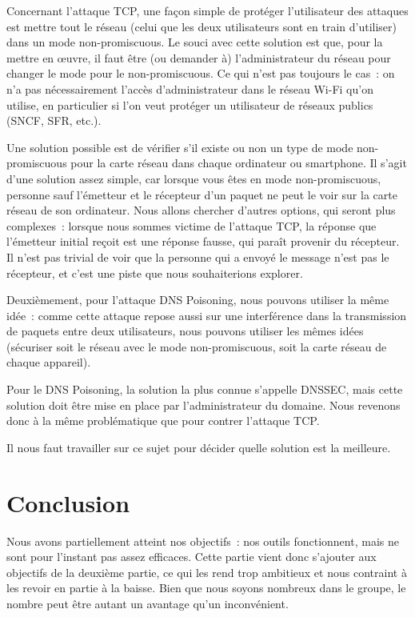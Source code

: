 \documentclass[a4paper, 12pt,twoside]{article}
\begin{document}
            Concernant l'attaque TCP, une façon simple de protéger l'utilisateur des attaques est mettre tout le réseau (celui que les deux utilisateurs sont en train d'utiliser) dans un mode non-promiscuous. Le souci avec cette solution est que, pour la mettre en \oe{}uvre, il faut être (ou demander à) l'administrateur du réseau pour changer le mode pour le non-promiscuous. Ce qui n'est pas toujours le cas~: on n'a pas nécessairement l'accès d'administrateur dans le réseau Wi-Fi qu'on utilise, en particulier si l'on veut protéger un utilisateur de réseaux publics (SNCF, SFR, etc.).

            Une solution possible est de vérifier s'il existe ou non un type de mode non-promiscuous pour la carte réseau dans chaque ordinateur ou smartphone. Il s'agit d'une solution assez simple, car lorsque vous êtes en mode non-promiscuous, personne sauf l'émetteur et le récepteur d'un paquet ne peut le voir sur la carte réseau de son ordinateur. Nous allons chercher d'autres options, qui seront plus complexes~:  lorsque nous sommes victime de l'attaque TCP, la réponse que l'émetteur initial reçoit est une réponse fausse, qui paraît provenir du récepteur. Il n'est pas trivial de voir que la personne qui a envoyé le message n'est pas le récepteur, et c'est une piste que nous souhaiterions explorer.

            Deuxièmement, pour l'attaque DNS Poisoning, nous pouvons utiliser la même idée~: comme cette attaque repose aussi sur une interférence dans la transmission de paquets entre deux utilisateurs, nous pouvons utiliser les mêmes idées (sécuriser soit le réseau avec le mode non-promiscuous, soit la carte réseau de chaque appareil).

            Pour le DNS Poisoning, la solution la plus connue s'appelle DNSSEC, mais cette solution doit être mise en place par l'administrateur du domaine. Nous revenons donc à la même problématique que pour contrer l'attaque TCP.

            Il nous faut travailler sur ce sujet pour décider quelle solution est la meilleure.

    \clearpage
    \section*{Conclusion}

        Nous avons partiellement atteint nos objectifs~: nos outils fonctionnent, mais ne sont pour l'instant pas assez efficaces. Cette partie vient donc s'ajouter aux objectifs de la deuxième partie, ce qui les rend trop ambitieux et nous contraint à les revoir en partie à la baisse. Bien que nous soyons nombreux dans le groupe, le nombre peut être autant un avantage qu'un inconvénient.
\end{document}
